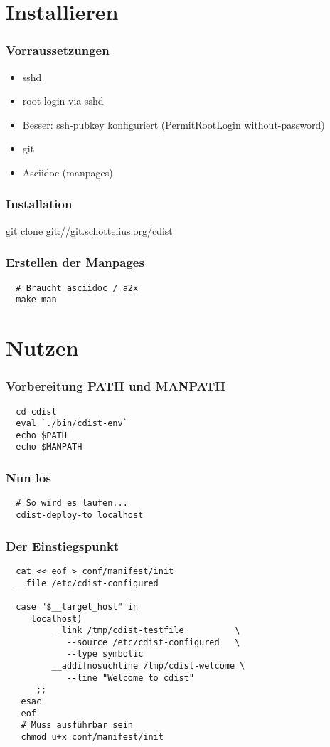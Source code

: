 \documentclass{beamer}
\begin{document}
\section{Installieren}
\frame
{
  \frametitle{Vorraussetzungen}
  \begin{itemize}[<+->]
     \item sshd
     \item root login via sshd
     \item Besser: ssh-pubkey konfiguriert (PermitRootLogin without-password)
     \item git
     \item Asciidoc (manpages)
  \end{itemize}
}

\frame
{
  \frametitle{Installation}
  \begin{center}
  git clone git://git.schottelius.org/cdist
  \end{center}
}

\begin{frame}[fragile]
  \frametitle{Erstellen der Manpages}

  \begin{verbatim}
  # Braucht asciidoc / a2x
  make man
  \end{verbatim}
\end{frame}

\section{Nutzen}
\begin{frame}[fragile]
  \frametitle{Vorbereitung PATH und MANPATH}

  \begin{verbatim}
  cd cdist
  eval `./bin/cdist-env`
  echo $PATH
  echo $MANPATH
  \end{verbatim}
\end{frame}

\begin{frame}[fragile]
  \frametitle{Nun los}
  \begin{verbatim}
  # So wird es laufen...
  cdist-deploy-to localhost
  \end{verbatim}
\end{frame}

\begin{frame}[fragile]
  \frametitle{Der Einstiegspunkt}
  \begin{small}
  \begin{verbatim}
  cat << eof > conf/manifest/init
  __file /etc/cdist-configured

  case "$__target_host" in
     localhost)
         __link /tmp/cdist-testfile          \
            --source /etc/cdist-configured   \ 
            --type symbolic
         __addifnosuchline /tmp/cdist-welcome \
            --line "Welcome to cdist"
      ;;
   esac
   eof
   # Muss ausführbar sein
   chmod u+x conf/manifest/init

  \end{verbatim}
  \end{small}
\end{frame}
\end{document}
